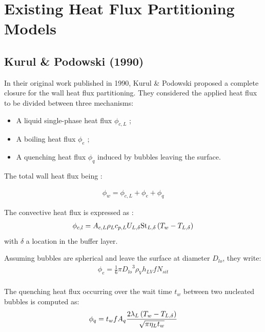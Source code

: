 
\chapter{Existing Heat Flux Partitioning Models} %

\label{ch:name} %


\section{Kurul \& Podowski (1990)}


In their original work published in 1990, Kurul \& Podowski \cite{kurul_1990} proposed a complete closure for the wall heat flux partitioning. They considered the applied heat flux to be divided between three mechanisms:

\begin{itemize}
\item A liquid single-phase heat flux $\phi_{c,L}$ ;
\item A boiling heat flux $\phi_{e}$ ;
\item A quenching heat flux $\phi_{q}$ induced by bubbles leaving the surface.
\end{itemize}

The total wall heat flux being :

\begin{align}
\phi_{w}=\phi_{c,L}+\phi_{e}+\phi_{q}
\end{align}

The convective heat flux is expressed as :
\begin{align}
\phi_{c,l}=A_{c,L} \rho_{L} c_{p,L}U_{L,\delta} \mathrm{St}_{L,\delta}\left( T_{w}-T_{L,\delta} \right)
\label{eq:HFP_KP_phiCL}
\end{align}
with $\delta$ a location in the buffer layer.

Assuming bubbles are spherical and leave the surface at diameter $D_{lo}$, they write:
\begin{align}
\phi_{e}=\frac{1}{6}\pi {D_{lo}}^{3}\rho_{V}h_{LV}fN_{sit}\\
\label{eq:HFP_KP_phiE}
\end{align}

The quenching heat flux occurring over the wait time $t_{w}$ between two nucleated bubbles is computed as:  
\begin{align}
\phi_{q}=t_{w}fA_{q}\frac{2\lambda_{L}\left( T_{w}-T_{L,\delta} \right)}{\sqrt{\pi \eta_{L} t_{w}}}
\label{eq:HFP_KP_phiQ}
\end{align}

